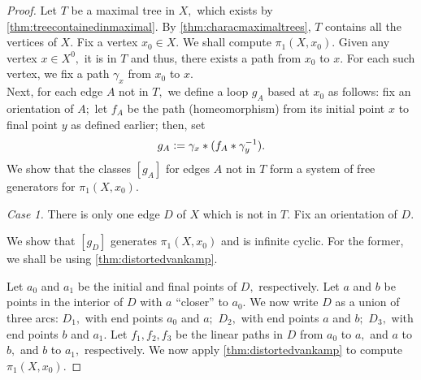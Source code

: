\documentclass[12pt]{article}
\begin{document}
\begin{proof} 
	Let $T$ be a maximal tree in $X,$ which exists by \cref{thm:treecontainedinmaximal}. By \cref{thm:characmaximaltrees}, $T$ contains all the vertices of $X.$ Fix a vertex $x_0 \in X.$ We shall compute $\pi_1(X, x_0).$ Given any vertex $x \in X^0,$ it is in $T$ and thus, there exists a path from $x_0$ to $x.$ For each such vertex, we fix a path $\gamma_x$ from $x_0$ to $x.$\\
	Next, for each edge $A$ not in $T,$ we define a loop $g_A$ based at $x_0$ as follows: fix an orientation of $A;$ let $f_A$ be the path (homeomorphism) from its initial point $x$ to final point $y$ as defined earlier; then, set
	\begin{equation*} 
		g_A \vcentcolon= \gamma_x*(f_A*\gamma_y^{-1}).
	\end{equation*}
	We show that the classes $[g_A]$ for edges $A$ not in $T$ form a system of free generators for $\pi_1(X, x_0).$

	\emph{Case 1.} There is only one edge $D$ of $X$ which is not in $T.$ Fix an orientation of $D.$ 

	We show that $[g_D]$ generates $\pi_1(X, x_0)$ and is infinite cyclic. For the former, we shall be using \cref{thm:distortedvankamp}. 

	Let $a_0$ and $a_1$ be the initial and final points of $D,$ respectively. Let $a$ and $b$ be points in the interior of $D$ with $a$ ``closer'' to $a_0.$ We now write $D$ as a union of three arcs: $D_1,$ with end points $a_0$ and $a;$ $D_2,$ with end points $a$ and $b;$ $D_3,$ with end points $b$ and $a_1.$ Let $f_1, f_2, f_3$ be the linear paths in $D$ from $a_0$ to $a,$ and $a$ to $b,$ and $b$ to $a_1,$ respectively. We now apply \cref{thm:distortedvankamp} to compute $\pi_1(X, x_0).$


\end{proof}
\end{document}
